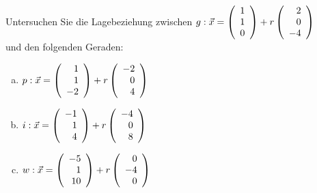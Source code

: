 \begin{aufgabe} ~ \\ 
Untersuchen Sie die Lagebeziehung zwischen $g: \vec{x}=\Vekd{1}{1}{0} + r\Vekd{2}{0}{-4}$\\ und den folgenden Geraden:\begin{enumerate}[a)] 
\item 
$p: \vec{x}=\Vekd{1}{1}{-2} + r\Vekd{-2}{0}{4}$
\item 
$i: \vec{x}=\Vekd{-1}{1}{4} + r\Vekd{-4}{0}{8}$
\item 
$w: \vec{x}=\Vekd{-5}{1}{10} + r\Vekd{0}{-4}{0}$
\end{enumerate} 
\end{aufgabe} 
